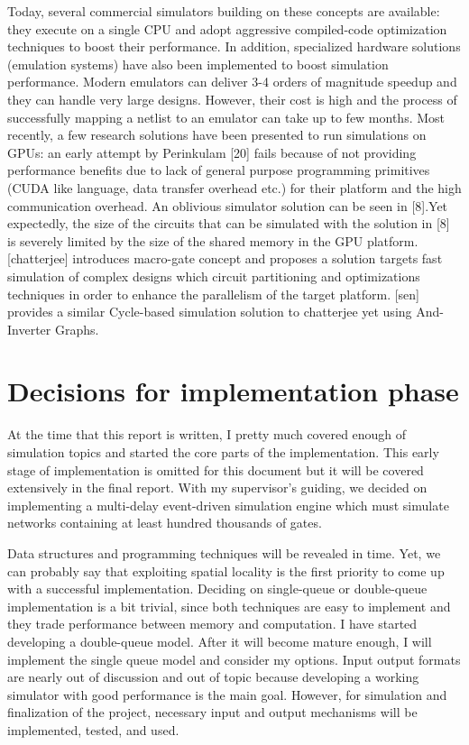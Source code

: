 \documentclass[12pt]{report}
\begin{document}
Today, several commercial simulators building on these concepts
are available: they execute on a single CPU and adopt aggressive
compiled-code optimization techniques to boost their performance.
In addition, specialized hardware solutions (emulation systems)
have also been implemented to boost simulation performance.
 Modern emulators can deliver 3-4 orders of magnitude
speedup and they can handle very large designs. However, their
cost is high and the process of successfully mapping
a netlist to an emulator can take up to few months.
Most recently, a few research solutions have been presented to
run simulations on GPUs: an early attempt by Perinkulam [20] fails because of not providing performance benefits due to lack of general purpose
programming primitives (CUDA like language, data transfer overhead etc.) for their platform and the high communication
overhead. An oblivious simulator solution can be seen in [8].Yet expectedly, the size of the circuits that can be simulated with the solution in [8] is severely limited by the size of the shared memory in the GPU platform.
[chatterjee] introduces macro-gate concept and proposes a solution targets fast simulation of complex designs which circuit partitioning and optimizations techniques in order to enhance the parallelism of the target platform. [sen] provides a similar Cycle-based simulation solution to chatterjee yet using And-Inverter Graphs.
 
 \section{Decisions for implementation phase}
 
At the time that this report is written, I pretty much covered enough of simulation topics and started the core parts of the implementation. This early stage of implementation is omitted for this document but it will be covered extensively in the final report. With my supervisor's guiding, we decided on implementing a multi-delay event-driven simulation engine which must simulate networks containing at least hundred thousands of gates. 

Data structures and programming techniques will be revealed in time. Yet, we can probably say that  exploiting spatial locality is the first priority to come up with a successful implementation. Deciding on single-queue or double-queue implementation is a bit trivial, since both techniques are easy to implement and they trade performance between memory and computation. I have started developing a double-queue model. After it will become mature enough, I will implement the single queue model and consider my options. Input output formats are nearly out of discussion and out of topic because developing a working simulator with good performance is the main goal. However, for simulation and finalization of the project, necessary input and output mechanisms will be implemented, tested, and used.
\end{document}
